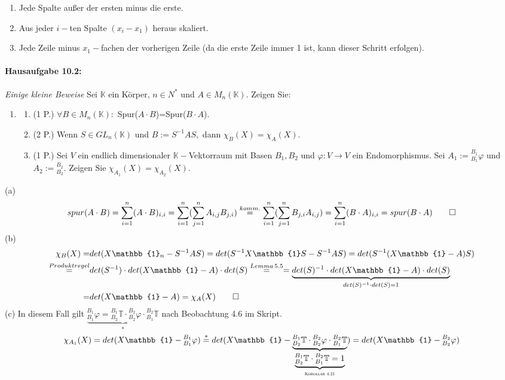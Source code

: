 \documentclass[titlepage]{article}
\newcommand{\K}{\mathbb{K}}
\newcommand{\1}{\mathbb{1}}
\newcommand{\0}{\mathbb{0}}
\newcommand{\T}{\mathbb{T}}
\begin{document}
		\begin{enumerate}
			\item Jede Spalte außer der ersten minus die erste.
			\item Aus jeder $i-$ten Spalte $(x_i-x_1)$ heraus skaliert.
			\item Jede Zeile minus $x_1-$fachen der vorherigen Zeile (da die erste Zeile immer 1 ist, kann dieser Schritt erfolgen).
		\end{enumerate}
		
		\paragraph{Hausaufgabe 10.2:} \textit{Einige kleine Beweise}
			Sei $\K$ ein Körper, $n\in N^*$ und $A\in M_n(\K).$ Zeigen Sie:
			\begin{enumerate}
				\item[]
				\begin{enumerate}
					\item (1 P.) $\forall B\in M_n(\K):$ Spur($A\cdot B$)=Spur($B\cdot A$).
					\item (2 P.) Wenn $S\in GL_n(\K)$ und $B:=S^{-1}AS,$ dann $\chi_B(X)=\chi_A(X)$.
					\item (1 P.) Sei $V$ ein endlich dimensionaler $\K-$Vektorraum mit Basen $B_1,B_2$ und $\varphi:V\rightarrow V$ ein Endomorphismus. Sei $A_1:={}^{B_1}_{B_1}\varphi$ und $A_2:={}^{B_2}_{B_2}.$ Zeigen Sie $\chi_{A_1}(X)=\chi_{A_2}(X).$ 
				\end{enumerate}
			\end{enumerate}
			(a)
			\begin{align*}
				spur(A\cdot B)=\sum^n_{i=1}(A\cdot B)_{i,i}=\sum^n_{i=1}(\sum^n_{j=1}A_{i,j}B_{j,i})\overset{komm.}{=}\sum^n_{i=1}(\sum^n_{j=1}B_{j,i}A_{i,j})=\sum^n_{i=1}(B\cdot A)_{i,i}=spur(B\cdot A)\qed
			\end{align*}
			(b)
			\begin{align*}
				\chi_B(X)=&det(X\1_n-S^{-1}AS)=det(S^{-1}X\1S-S^{-1}AS)=det(S^{-1}(X\1-A)S)\\
				\overset{Produktregel}{=}&det(S^{-1})\cdot det(X\1-A)\cdot det(S)\overset{Lemma\,5.5}{=}=\underbrace{det(S)^{-1}\cdot det(X\1-A)\cdot det(S)}_{det(S)^{-1}\cdot det(S)=1}\\
				=&det(X\1-A)=\chi_A(X)\qed
			\end{align*}
			(c) In diesem Fall gilt $\underbrace{^{B_1}_{B_1}\varphi={}^{B_1}_{B_2}\T\cdot{}^{B_2}_{B_2}\varphi\cdot{}^{B_2}_{B_1}\T}_*$ nach Beobachtung 4.6 im Skript.
			\begin{align*}
				\chi_{A_1}(X)=det(X\1-{}^{B_1}_{B_1}\varphi)\overset{*}{=}det(X\1-\underbrace{{}^{B_1}_{B_2}\T\cdot{}^{B_2}_{B_2}\varphi\cdot{}^{B_2}_{B_1}\T}_{\underbrace{{}^{B_1}_{B_2}\T\cdot{}^{B_2}_{B_1}\T=1}_{\textsc{Korollar 4.21}}})=det(X\1-{}^{B_2}_{B_2}\varphi)
			\end{align*}
\end{document}
